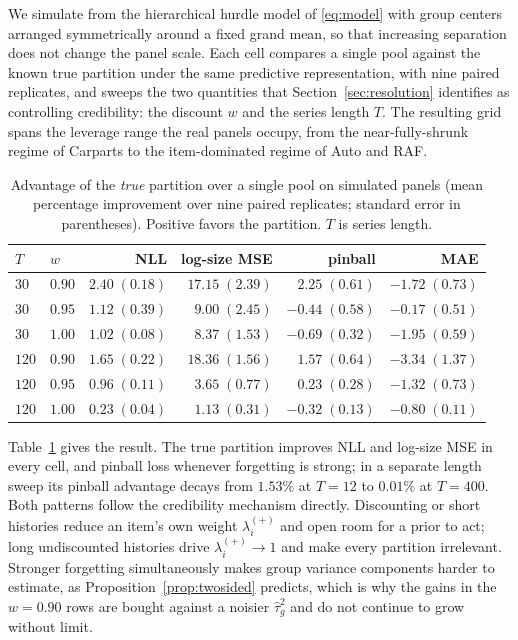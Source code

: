 We simulate from the hierarchical hurdle model of \eqref{eq:model} with
group centers arranged symmetrically around a fixed grand mean, so that
increasing separation does not change the panel scale. Each cell compares
a single pool against the known true partition under the same predictive
representation, with nine paired replicates, and sweeps the two quantities
that Section~\ref{sec:resolution} identifies as controlling credibility:
the discount $w$ and the series length $T$. The resulting grid spans the
leverage range the real panels occupy, from the near-fully-shrunk regime
of Carparts to the item-dominated regime of Auto and RAF.

\begin{table}[t]
\centering
\caption{Advantage of the \emph{true} partition over a single pool on
simulated panels (mean percentage improvement over nine paired replicates;
standard error in parentheses). Positive favors the partition. $T$ is
series length.}
\label{tab:sanity}
\small
\setlength{\tabcolsep}{3.5pt}
\begin{tabular}{llrrrr}
\toprule
$T$ & $w$ & NLL & log-size MSE & pinball & MAE\\
\midrule
$30$ & $0.90$ & $2.40\;(0.18)$ & $17.15\;(2.39)$ & $2.25\;(0.61)$ & $-1.72\;(0.73)$\\
$30$ & $0.95$ & $1.12\;(0.39)$ & $9.00\;(2.45)$ & $-0.44\;(0.58)$ & $-0.17\;(0.51)$\\
$30$ & $1.00$ & $1.02\;(0.08)$ & $8.37\;(1.53)$ & $-0.69\;(0.32)$ & $-1.95\;(0.59)$\\
$120$ & $0.90$ & $1.65\;(0.22)$ & $18.36\;(1.56)$ & $1.57\;(0.64)$ & $-3.34\;(1.37)$\\
$120$ & $0.95$ & $0.96\;(0.11)$ & $3.65\;(0.77)$ & $0.23\;(0.28)$ & $-1.32\;(0.73)$\\
$120$ & $1.00$ & $0.23\;(0.04)$ & $1.13\;(0.31)$ & $-0.32\;(0.13)$ & $-0.80\;(0.11)$\\
\bottomrule
\end{tabular}
\end{table}

Table~\ref{tab:sanity} gives the result. The true partition improves NLL
and log-size MSE in every cell, and pinball loss whenever forgetting is
strong; in a separate length sweep its pinball advantage decays from
$1.53\%$ at $T=12$ to $0.01\%$ at $T=400$. Both patterns follow the
credibility mechanism directly. Discounting or short histories reduce an
item's own weight $\lambda^{(+)}_i$ and open room for a prior to act;
long undiscounted histories drive $\lambda^{(+)}_i\to1$ and make every
partition irrelevant. Stronger forgetting simultaneously makes group
variance components harder to estimate, as
Proposition~\ref{prop:twosided} predicts, which is why the gains in the
$w=0.90$ rows are bought against a noisier $\hat\tau_g^2$ and do not
continue to grow without limit.

